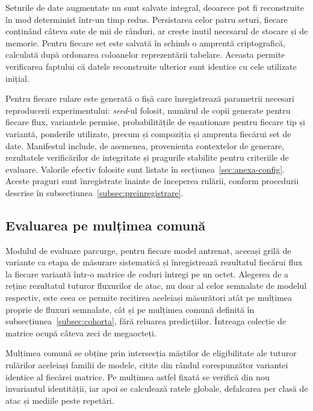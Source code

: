 Seturile de date augmentate nu sunt salvate integral, deoarece pot fi reconstruite în mod determinist într-un timp redus. Persistarea celor patru seturi, fiecare conținând câteva sute de mii de rânduri, ar crește inutil necesarul de stocare și de memorie. Pentru fiecare set este salvată în schimb o amprentă criptografică, calculată după ordonarea coloanelor reprezentării tabelare. Aceasta permite verificarea faptului că datele reconstruite ulterior sunt identice cu cele utilizate inițial.

Pentru fiecare rulare este generată o fișă care înregistrează parametrii necesari reproducerii experimentului: \textit{seed}-ul folosit, numărul de copii generate pentru fiecare flux, variantele permise, probabilitățile de eșantionare pentru fiecare tip și variantă, ponderile utilizate, precum și compoziția și amprenta fiecărui set de date. Manifestul include, de asemenea, proveniența contextelor de generare, rezultatele verificărilor de integritate și pragurile stabilite pentru criteriile de evaluare. Valorile efectiv folosite sunt listate în secțiunea~\ref{sec:anexa-config}. Aceste praguri sunt înregistrate înainte de începerea rulării, conform procedurii descrise în subsecțiunea~\ref{subsec:preinregistrare}.

\subsection{Evaluarea pe mulțimea comună}\label{subsec:implcohorta}

Modulul de evaluare parcurge, pentru fiecare model antrenat, aceeași grilă de variante ca etapa de măsurare sistematică și înregistrează rezultatul fiecărui flux la fiecare variantă într-o matrice de coduri întregi pe un octet. Alegerea de a reține rezultatul tuturor fluxurilor de atac, nu doar al celor semnalate de modelul respectiv, este ceea ce permite recitirea aceleiași măsurători atât pe mulțimea proprie de fluxuri semnalate, cât și pe mulțimea comună definită în subsecțiunea~\ref{subsec:cohorta}, fără reluarea predicțiilor. Întreaga colecție de matrice ocupă câteva zeci de megaocteți.

Mulțimea comună se obține prin intersecția măștilor de eligibilitate ale tuturor rulărilor aceleiași familii de modele, citite din rândul corespunzător variantei identice al fiecărei matrice. Pe mulțimea astfel fixată se verifică din nou invariantul identității, iar apoi se calculează ratele globale, defalcarea per clasă de atac și mediile peste repetări.

